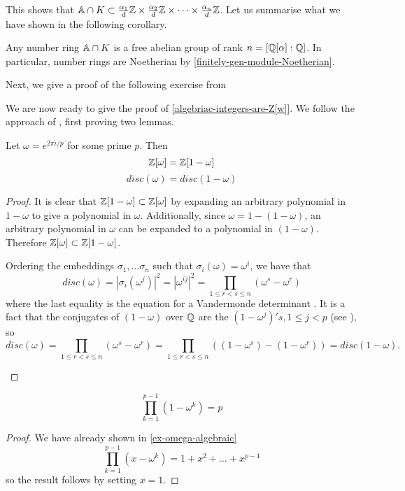 This shows that $\mathbb{A}\cap K\subset \frac{\alpha_1}{d}\mathbb{Z}\times \frac{\alpha_2}{d}\mathbb{Z}\times \dots \times \frac{\alpha_n}{d}\mathbb{Z}$. Let us summarise what we have shown in the following corollary.
\begin{corollary}\label{number-rings-are-Noetherian}
Any number ring $\mathbb{A}\cap K$ is a free abelian group of rank $n=[\mathbb{Q}[\alpha]:\mathbb{Q}]$. In particular, number rings are Noetherian by \cref{finitely-gen-module-Noetherian}.
\end{corollary}

Next, we give a proof of the following exercise from \cite{NumberFields}


We are now ready to give the proof of \cref{algebriac-integers-are-Z[w]}. We follow the approach of \cite{NumberFields}, first proving two lemmas.
\begin{lemma}
Let $\omega=e^{2\pi i/p}$ for some prime $p.$ Then $$\mathbb{Z}[\omega]=\mathbb{Z}[1-\omega]$$ $$disc(\omega)=disc(1-\omega)$$
\end{lemma}
\begin{proof}
It is clear that $\mathbb{Z}[1-\omega]\subset\mathbb{Z}[\omega]$ by expanding an arbitrary polynomial in $1-\omega$ to give a polynomial in $\omega$. Additionally, since $\omega=1-(1-\omega)$, an arbitrary polynomial in $\omega$ can be expanded to a polynomial in $(1-\omega).$ Therefore $\mathbb{Z}[\omega]\subset \mathbb{Z}[1-\omega]$.

Ordering the embeddings $\sigma_1,\dots \sigma_n$ such that $\sigma_i(\omega)=\omega^i$, we have that
$$disc(\omega)=|\sigma_i(\omega^j)|^2=|\omega^{ij}|^2=\prod_{1\leq r<s\leq n} (\omega^s-\omega^r)$$ where the last equality is the equation for a Vandermonde determinant \cite{NumberFields}. It is a fact that the conjugates of $(1-\omega)$ over $\mathbb{Q}$ are the $(1-\omega^j)'s, 1\leq j< p$ (see \cite{NumberFields}), so
$$disc(\omega)=\prod_{1\leq r<s\leq n} (\omega^s-\omega^r)=\prod_{1\leq r<s\leq n} ((1-\omega^s)-(1-\omega^r))=disc(1-\omega).$$

\cite{NumberFields}
\end{proof}
\begin{lemma}\label{product-of-1-omegak-p}
$$\prod_{k=1}^{p-1}(1-\omega^k)=p$$
\end{lemma}
\begin{proof}
We have already shown in \cref{ex-omega-algebraic}
$$\prod_{k=1}^{p-1}(x-\omega^k)=1+x^2+\dots+x^{p-1}$$
so the result follows by setting $x=1$.
\end{proof}

